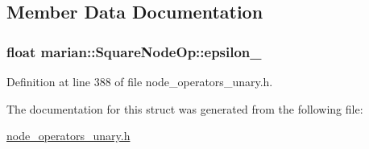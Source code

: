 \subsection{Member Data Documentation}
\subsubsection[{\texorpdfstring{epsilon\+\_\+}{epsilon_}}]{\setlength{\rightskip}{0pt plus 5cm}float marian\+::\+Square\+Node\+Op\+::epsilon\+\_\+}\hypertarget{structmarian_1_1SquareNodeOp_a47d7e1e8899790899124558cfdcacf20}{}\label{structmarian_1_1SquareNodeOp_a47d7e1e8899790899124558cfdcacf20}


Definition at line 388 of file node\+\_\+operators\+\_\+unary.\+h.



The documentation for this struct was generated from the following file\+:\begin{DoxyCompactItemize}
\item 
\hyperlink{node__operators__unary_8h}{node\+\_\+operators\+\_\+unary.\+h}\end{DoxyCompactItemize}
